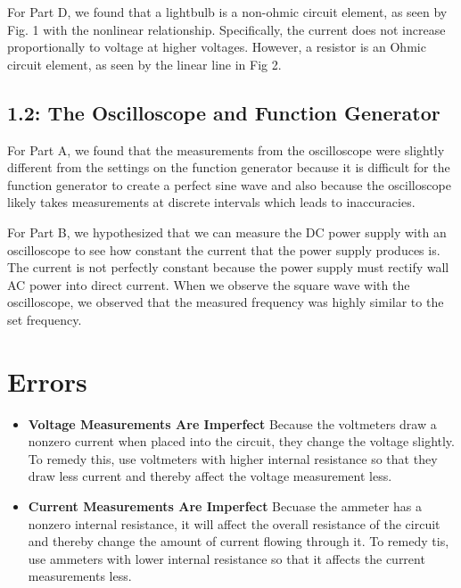 \documentclass[10pt]{article}
\begin{document}
	For Part D, we found that a lightbulb is a non-ohmic circuit element, as seen by Fig. 1 with the nonlinear relationship. Specifically, the current does not increase proportionally to voltage at higher voltages. 
	However, a resistor is an Ohmic circuit element, as seen by the linear line in Fig 2.
	
	\subsection{1.2: The Oscilloscope and Function Generator}
	For Part A, we found that the measurements from the oscilloscope were slightly different from the settings on the function generator because it is difficult for the function generator to create a perfect sine wave and also because the oscilloscope likely takes measurements at discrete intervals which leads to inaccuracies. \newline
	
	For Part B, we hypothesized that we can measure the DC power supply with an oscilloscope to see how constant the current that the power supply produces is. The current is not perfectly constant because the power supply must rectify wall AC power into direct current. When we observe the square wave with the oscilloscope, we observed that the measured frequency was highly similar to the set frequency. 
	
	
	\medskip
	
	
	\section{Errors}
	
	
	
	\medskip
	
	
	\begin{itemize}
		\item \textbf{Voltage Measurements Are Imperfect} Because the voltmeters draw a nonzero current when placed into the circuit, they change the voltage slightly. To remedy this, use voltmeters with higher internal resistance so that they draw less current and thereby affect the voltage measurement less. 
		\item \textbf{Current Measurements Are Imperfect} Becuase the ammeter has a nonzero internal resistance, it will affect the overall resistance of the circuit and thereby change the amount of current flowing through it. To remedy tis, use ammeters with lower internal resistance so that it affects the current measurements less. 
	\end{itemize}
	
\end{document}

